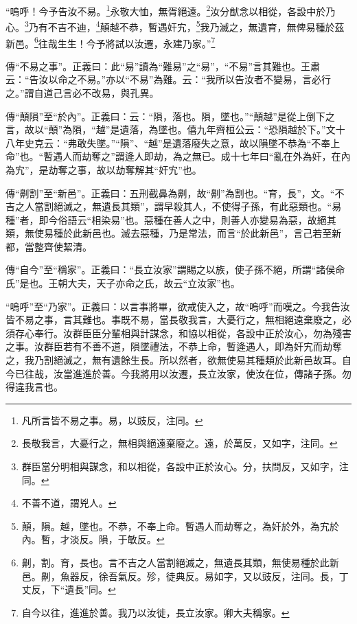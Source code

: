 “嗚呼！今予告汝不易。\footnote{凡所言皆不易之事。易，以豉反，注同。}永敬大恤，無胥絕遠。\footnote{長敬我言，大憂行之，無相與絕遠棄廢之。遠，於萬反，又如字，注同。}汝分猷念以相從，各設中於乃心。\footnote{群臣當分明相與謀念，和以相從，各設中正於汝心。分，扶問反，又如字，注同。}乃有不吉不迪，\footnote{不善不道，謂兇人。}顛越不恭，暫遇奸宄，\footnote{顛，隕。越，墜也。不恭，不奉上命。暫遇人而劫奪之，為奸於外，為宄於內。暫，才淡反。隕，于敏反。}我乃滅之，無遺育，無俾易種於茲新邑。\footnote{劓，割。育，長也。言不吉之人當割絕滅之，無遺長其類，無使易種於此新邑。劓，魚器反，徐吾氣反。殄，徒典反。易如字，又以豉反，注同。長，丁丈反，下“遺長”同。}往哉生生！今予將試以汝遷，永建乃家。”\footnote{自今以往，進進於善。我乃以汝徙，長立汝家。卿大夫稱家。}

{\noindent\zhuan{}\fzbyks 傳“不易之事”。正義曰：此“易”讀為“難易”之“易”，“不易”言其難也。王肅云：“告汝以命之不易。”亦以“不易”為難。云：“我所以告汝者不變易，言必行之。”謂自道己言必不改易，與孔異。 \par}

{\noindent\zhuan{}\fzbyks 傳“顛隕”至“於內”。正義曰：云：“隕，落也。隕，墜也。”“顛越”是從上倒下之言，故以“顛”為隕，“越”是遺落，為墜也。僖九年齊桓公云：“恐隕越於下。”文十八年史克云：“弗敢失墜。”“隕”、“越”是遺落廢失之意，故以隕墜不恭為“不奉上命”也。“暫遇人而劫奪之”謂逄人即劫，為之無已。成十七年曰“亂在外為奸，在內為宄”，是劫奪之事，故以劫奪解其“奸宄”也。 \par}

{\noindent\zhuan{}\fzbyks 傳“劓割”至“新邑”。正義曰：五刑截鼻為劓，故“劓”為割也。“育，長”，文。“不吉之人當割絕滅之，無遺長其類”，謂早殺其人，不使得子孫，有此惡類也。“易種”者，即今俗語云“相染易”也。惡種在善人之中，則善人亦變易為惡，故絕其類，無使易種於此新邑也。滅去惡種，乃是常法，而言“於此新邑”，言己若至新都，當整齊使絜清。 \par}

{\noindent\zhuan{}\fzbyks 傳“自今”至“稱家”。正義曰：“長立汝家”謂賜之以族，使子孫不絕，所謂“諸侯命氏”是也。王朝大夫，天子亦命之氏，故云“立汝家”也。 \par}

{\noindent\shu{}\fzkt “嗚呼”至“乃家”。正義曰：以言事將畢，欲戒使入之，故“嗚呼”而嘆之。今我告汝皆不易之事，言其難也。事既不易，當長敬我言，大憂行之，無相絕遠棄廢之，必須存心奉行。汝群臣臣分輩相與計謀念，和協以相從，各設中正於汝心，勿為殘害之事。汝群臣若有不善不道，隕墜禮法，不恭上命，暫逄遇人，即為奸宄而劫奪之，我乃割絕滅之，無有遺餘生長。所以然者，欲無使易其種類於此新邑故耳。自今已往哉，汝當進進於善。今我將用以汝遷，長立汝家，使汝在位，傳諸子孫。勿得違我言也。 \par}

